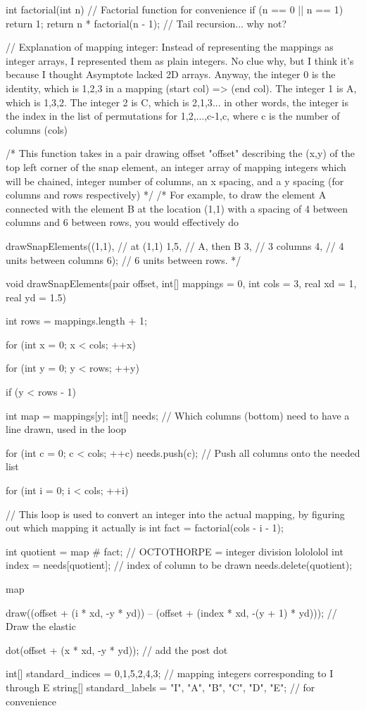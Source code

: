 \documentclass[../gatm.tex]{subfiles}
\begin{document}
\begin{asydef}
	int factorial(int n) { // Factorial function for convenience
		if (n == 0 || n == 1)
			return 1;
		return n * factorial(n - 1); // Tail recursion... why not?
	}
	
	// Explanation of mapping integer: Instead of representing the mappings as integer arrays, I represented them as plain integers. No clue why, but I think it's because I thought Asymptote lacked 2D arrays. Anyway, the integer 0 is the identity, which is {1,2,3} in a mapping (start col) => (end col). The integer 1 is A, which is {1,3,2}. The integer 2 is C, which is {2,1,3}... in other words, the integer is the index in the list of permutations for {1,2,...,c-1,c}, where c is the number of columns (cols)
	
	/* This function takes in a pair drawing offset "offset" describing the (x,y) of the top left corner of the snap element, an integer array of mapping integers which will be chained, integer number of columns, an x spacing, and a y spacing (for columns and rows respectively) */
	/* For example, to draw the element A connected with the element B at the location (1,1) with a spacing of 4 between columns and 6 between rows, you would effectively do
	
	drawSnapElements((1,1), // at (1,1)
					 {1,5}, // A, then B
					 3, // 3 columns
					 4, // 4 units between columns
					 6); // 6 units between rows.
	*/
	
	void drawSnapElements(pair offset, int[] mappings = {0}, int cols = 3, real xd = 1, real yd = 1.5) {
		int rows = mappings.length + 1;
		
		for (int x = 0; x < cols; ++x) {
			for (int y = 0; y < rows; ++y) {
				if (y < rows - 1) {
					int map = mappings[y];
					int[] needs; // Which columns (bottom) need to have a line drawn, used in the loop

					for (int c = 0; c < cols; ++c) needs.push(c); // Push all columns onto the needed list

					for (int i = 0; i < cols; ++i) { // This loop is used to convert an integer into the actual mapping, by figuring out which mapping it actually is
						int fact = factorial(cols - i - 1);

						int quotient = map # fact; // OCTOTHORPE = integer division lolololol
						int index = needs[quotient]; // index of column to be drawn
						needs.delete(quotient);

						map %

						draw((offset + (i * xd, -y * yd)) -- (offset + (index * xd, -(y + 1) * yd))); // Draw the elastic
					}
				}
				dot(offset + (x * xd, -y * yd)); // add the post dot
			}
		}
	}
	
	int[] standard_indices = {0,1,5,2,4,3}; // mapping integers corresponding to I through E
	string[] standard_labels = {"I", "A", "B", "C", "D", "E"}; // for convenience
\end{asydef}
\end{document}
